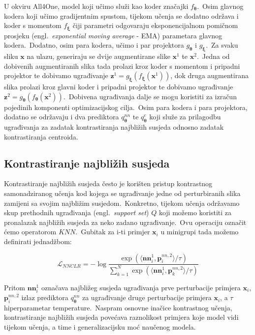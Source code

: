 \documentclass[diplomskirad]{fer}
\begin{document}
\pagebreak

U okviru All4One, model koji učimo služi kao koder značajki $f_{\bm{\theta}}$.\ Osim glavnog kodera koji učimo gradijentnim spustom, tijekom učenja se dodatno održava i koder s momentom $f_{\bm{\xi}}$ čiji parametri odgovaraju eksponencijalnom pomičnom prosjeku (engl.\ \textit{exponential moving average} - EMA) parametara glavnog kodera.\
Dodatno, osim para kodera, učimo i par projektora $g_{\bm{\theta}}$ i $g_{\bm{\xi}}$.\ Za svaku sliku $\bm{x}$ na ulazu, generiraju se dvije augmentirane slike $\bm{x}^1$ te $\bm{x}^2$.\ 
Jedna od dobivenih augmentiranih slika tada prolazi kroz koder s momentom i pripadni projektor te dobivamo ugrađivanje $\bm{z}^1 = g_{\bm{\xi}}(f_{\bm{\xi}}(\bm{x}^1))$, dok druga augmentirana slika prolazi kroz glavni koder i pripadni projektor te dobivamo ugrađivanje $\bm{z}^2 = g_{\bm{\theta}}(f_{\bm{\theta}}(\bm{x}^2))$.\
Dobivena ugrađivanja dalje se mogu koristiti za izračun pojedinih komponenti optimizacijskog cilja.\ Osim para kodera i para projektora, dodatno se održavaju i dva prediktora $q_{\bm{\theta}}^{nn}$ te $q_{\bm{\theta}}^{c}$ koji služe za prilagodbu ugrađivanja za zadatak kontrastiranja najbližih susjeda odnosno zadatak kontrastiranja centroida.\

\subsection{Kontrastiranje najbližih susjeda}
\label{sub:knn}

Kontrastiranje najbližih susjeda često je korišten pristup kontrastnog samonadziranog učenja kod kojega se ugrađivanje jedne od perturbiranih slika zamijeni sa svojim najbližim susjedom.\ 
Konkretno, tijekom učenja održavamo skup prethodnih ugrađivanja (engl.\ \textit{support set}) $Q$ koji možemo koristiti za pronalazak najbližih susjeda za neko zadano ugrađivanje.\ Ovu operaciju označit ćemo operatorom $KNN$.\ 
Gubitak za i-ti primjer $\bm{x}_i$ u minigrupi tada možemo definirati jednadžbom:

\begin{equation}
  \mathcal{L}_{NNCLR} = - \log{\frac{\exp(\langle \bm{nn}_{i}^{1}, \bm{p}_{i}^{nn, 2} \rangle / \tau)}{\sum_{k=1}^{N}{\exp(\langle \bm{nn}_{i}^{1}, \bm{p}_{k}^{nn, 2} \rangle / \tau)}}}
  \label{eq:NNCLR_loss}
\end{equation}

Pritom $\bm{nn}_{i}^{1}$ označava najbližeg susjeda ugrađivanja prve perturbacije primjera $\bm{x}_i$, $\bm{p}_{i}^{nn, 2}$ izlaz prediktora $q_{\bm{\theta}}^{nn}$ za ugrađivanje druge perturbacije primjera $\bm{x}_i$, a $\tau$ hiperparametar temperature.\ 
Naspram osnovne inačice kontrastnog učenja, kontrastiranje najbližih susjeda povećava raznolikost primjera koje model vidi tijekom učenja, a time i generalizacijsku moć naučenog modela.\ 
\end{document}
